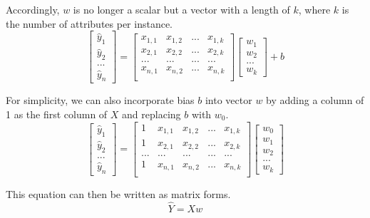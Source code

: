 \documentclass[
	letterpaper
]{article}
\begin{document}
Accordingly, $w$ is no longer a scalar but a vector with a length of $k$, where $k$ is the number of attributes per instance.
\begin{equation}
\begin{bmatrix}\hat y_1 \\ \hat y_2 \\ ... \\ \hat y_n\end{bmatrix}
 = \begin{bmatrix}
x_{1, 1} & x_{1, 2} & ... & x_{1, k} \\
x_{2, 1} & x_{2, 2} & ... & x_{2, k} \\
... & ... & ... & ... \\
x_{n, 1} & x_{n, 2} & ... & x_{n, k} \\
\end{bmatrix}
\begin{bmatrix} w_1 \\  w_2 \\ ... \\ w_k\end{bmatrix}
+b
\end{equation}

For simplicity, we can also incorporate bias $b$ into vector $w$ by adding a column of 1 as the first column of $X$ and replacing $b$ with $w_0$.
\begin{equation}
\begin{bmatrix}\hat y_1 \\ \hat y_2 \\ ... \\ \hat y_n\end{bmatrix}
 = \begin{bmatrix}
1 & x_{1, 1} & x_{1, 2} & ... & x_{1, k} \\
1 & x_{2, 1} & x_{2, 2} & ... & x_{2, k} \\
... & ... & ... & ... & ... \\
1 & x_{n, 1} & x_{n, 2} & ... & x_{n, k} \\
\end{bmatrix}
\begin{bmatrix} w_0 \\ w_1 \\  w_2 \\ ... \\ w_k\end{bmatrix}
\end{equation}

This equation can then be written as matrix forms.
\begin{equation}
\hat Y= X w
\end{equation}
\end{document}
